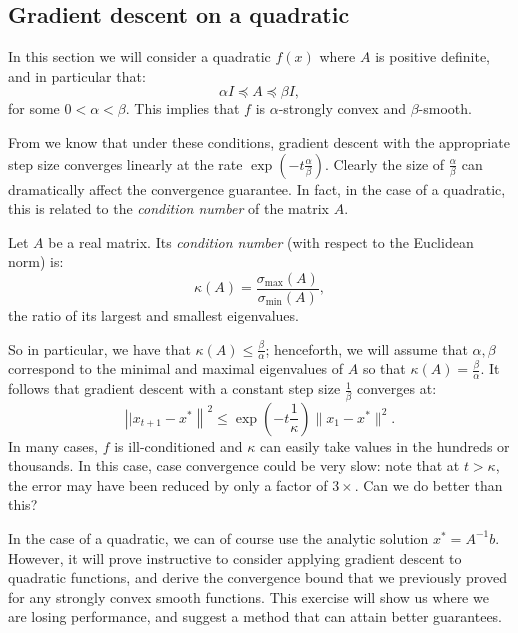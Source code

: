 \subsection{Gradient descent on a quadratic}
In this section we will consider a quadratic $f(x)$ where $A$ is positive definite, and in particular that:
\begin{equation*}
\alpha I \preceq A \preceq \beta I,
\end{equation*}
for some $0 < \alpha < \beta$. This implies that $f$ is $\alpha$-strongly convex and $\beta$-smooth. 

From  we know that under these conditions, gradient descent with the appropriate step size converges linearly at the rate $\exp\left(-t \frac{\alpha}{\beta}\right)$. Clearly the size of $\frac{\alpha}{\beta}$ can dramatically affect the convergence guarantee. In fact, in the case of a quadratic, this is related to the \textit{condition number} of the matrix $A$.

\begin{definition}
Let $A$ be a real matrix. Its \textit{condition number} (with respect to the Euclidean norm) is:
\begin{equation*}
\kappa(A) = \frac{\sigma_{\max}(A)}{\sigma_{\min}(A)},
\end{equation*}
the ratio of its largest and smallest eigenvalues.
\end{definition}

So in particular, we have that $\kappa(A) \leq \frac{\beta}{\alpha}$; henceforth, we will assume that $\alpha, \beta$ correspond to the minimal and maximal eigenvalues of $A$ so that $\kappa(A) = \frac{\beta}{\alpha}$. It follows that gradient descent with a constant step size $\frac{1}{\beta}$ converges at:
\begin{equation*}
\left||x_{t+1} - x^*\right\|^2 \leq \exp{\left(-t \frac{1}{\kappa}\right)}\|x_1 - x^*\|^2.
\end{equation*}
In many cases, $f$ is ill-conditioned and $\kappa$ can easily take values in the hundreds or thousands. In this case, case convergence could be very slow: note that at $t > \kappa$, the error may have been reduced by only a factor of $3\times$. Can we do better than this?

In the case of a quadratic, we can of course use the analytic solution $x^* = A^{-1}b$. However, it will prove instructive to consider applying gradient descent to quadratic functions, and derive the convergence bound that we previously proved for any strongly convex smooth functions. This exercise will show us where we are losing performance, and suggest a method that can attain better guarantees.

